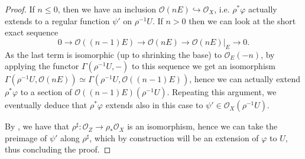 \documentclass{amsart}
\newcommand{\cO}{\mathcal{O}}
\theoremstyle{definition}
\begin{document}
\begin{proof}
    If $n\leq 0$, then we have an inclusion $\cO(nE)\hookrightarrow \cO_X$, i.e. $\rho^*\varphi$ actually extends to a regular function $\psi'$ on $\rho^{-1}U$. If $n>0$ then we can look at the short exact sequence
    \[0 \to \cO((n-1)E) \to \cO(nE) \to \cO(nE)|_{E} \to 0. \]
    As the last term is isomorphic (up to shrinking the base) to $\cO_E(-n)$, by applying the functor $\Gamma(\rho^{-1}U,-)$ to this sequence we get an isomorphism $\Gamma(\rho^{-1}U,\cO(nE))\simeq \Gamma(\rho^{-1}U,\cO((n-1)E))$, hence we can actually extend $\rho^*\varphi$ to a section of $\cO((n-1)E)(\rho^{-1}U)$. Repeating this argument, we eventually deduce that $\rho^*\varphi$ extends also in this case to $\psi'\in \cO_X(\rho^{-1}U)$.

    By , we have that $\rho^{\sharp}:\cO_Z \to \rho_*\cO_X$ is an isomorphism, hence we can take the preimage of $\psi'$ along $\rho^\sharp$, which by construction will be an extension of $\varphi$ to $U$, thus concluding the proof.
\end{proof}
\end{document}
